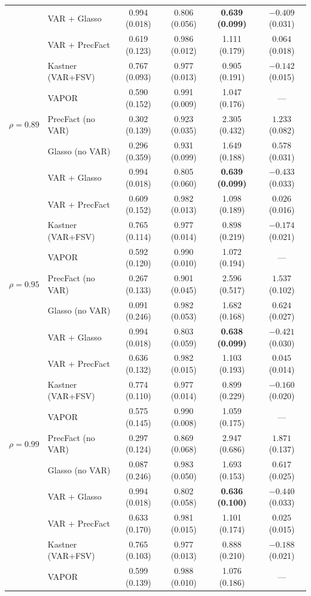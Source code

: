 \begin{table}[h!]
\begin{tabular}{llcccc}
              & VAR + Glasso       & 0.994 (0.018) & 0.806 (0.056) & \textbf{0.639 (0.099)} & $-0.409$ (0.031) \\
              & VAR + PrecFact     & 0.619 (0.123) & 0.986 (0.012) & 1.111 (0.179) & $0.064$ (0.018) \\
              & Kastner (VAR+FSV)  & 0.767 (0.093) & 0.977 (0.013) & 0.905 (0.191) & $-0.142$ (0.015) \\
              & VAPOR              & 0.590 (0.152) & 0.991 (0.009) & 1.047 (0.176) & --- \\
\midrule
$\rho = 0.89$ & PrecFact (no VAR)  & 0.302 (0.139) & 0.923 (0.035) & 2.305 (0.432) & $1.233$ (0.082) \\
              & Glasso (no VAR)    & 0.296 (0.359) & 0.931 (0.099) & 1.649 (0.188) & $0.578$ (0.031) \\
              & VAR + Glasso       & 0.994 (0.018) & 0.805 (0.060) & \textbf{0.639 (0.099)} & $-0.433$ (0.033) \\
              & VAR + PrecFact     & 0.609 (0.152) & 0.982 (0.013) & 1.098 (0.189) & $0.026$ (0.016) \\
              & Kastner (VAR+FSV)  & 0.765 (0.114) & 0.977 (0.014) & 0.898 (0.219) & $-0.174$ (0.021) \\
              & VAPOR              & 0.592 (0.120) & 0.990 (0.010) & 1.072 (0.194) & --- \\
\midrule
$\rho = 0.95$ & PrecFact (no VAR)  & 0.267 (0.133) & 0.901 (0.045) & 2.596 (0.517) & $1.537$ (0.102) \\
              & Glasso (no VAR)    & 0.091 (0.246) & 0.982 (0.053) & 1.682 (0.168) & $0.624$ (0.027) \\
              & VAR + Glasso       & 0.994 (0.018) & 0.803 (0.059) & \textbf{0.638 (0.099)} & $-0.421$ (0.030) \\
              & VAR + PrecFact     & 0.636 (0.132) & 0.982 (0.015) & 1.103 (0.193) & $0.045$ (0.014) \\
              & Kastner (VAR+FSV)  & 0.774 (0.110) & 0.977 (0.014) & 0.899 (0.229) & $-0.160$ (0.020) \\
              & VAPOR              & 0.575 (0.145) & 0.990 (0.008) & 1.059 (0.175) & --- \\
\midrule
$\rho = 0.99$ & PrecFact (no VAR)  & 0.297 (0.124) & 0.869 (0.068) & 2.947 (0.686) & $1.871$ (0.137) \\
              & Glasso (no VAR)    & 0.087 (0.246) & 0.983 (0.050) & 1.693 (0.153) & $0.617$ (0.025) \\
              & VAR + Glasso       & 0.994 (0.018) & 0.802 (0.058) & \textbf{0.636 (0.100)} & $-0.440$ (0.033) \\
              & VAR + PrecFact     & 0.633 (0.170) & 0.981 (0.015) & 1.101 (0.174) & $0.025$ (0.015) \\
              & Kastner (VAR+FSV)  & 0.765 (0.103) & 0.977 (0.013) & 0.888 (0.210) & $-0.188$ (0.021) \\
              & VAPOR              & 0.599 (0.139) & 0.988 (0.010) & 1.076 (0.186) & --- \\
\bottomrule
\end{tabular}
\end{table}

